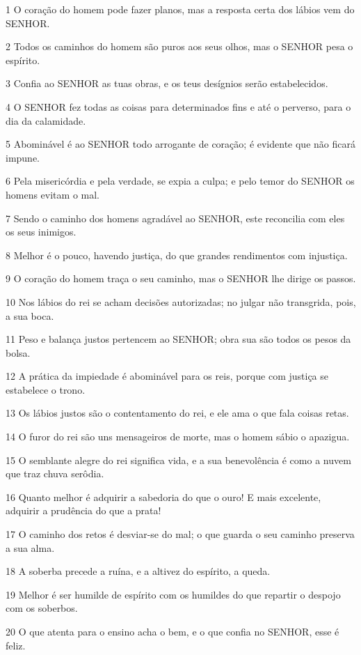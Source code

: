 \par 1 O coração do homem pode fazer planos, mas a resposta certa dos lábios vem do SENHOR.
\par 2 Todos os caminhos do homem são puros aos seus olhos, mas o SENHOR pesa o espírito.
\par 3 Confia ao SENHOR as tuas obras, e os teus desígnios serão estabelecidos.
\par 4 O SENHOR fez todas as coisas para determinados fins e até o perverso, para o dia da calamidade.
\par 5 Abominável é ao SENHOR todo arrogante de coração; é evidente que não ficará impune.
\par 6 Pela misericórdia e pela verdade, se expia a culpa; e pelo temor do SENHOR os homens evitam o mal.
\par 7 Sendo o caminho dos homens agradável ao SENHOR, este reconcilia com eles os seus inimigos.
\par 8 Melhor é o pouco, havendo justiça, do que grandes rendimentos com injustiça.
\par 9 O coração do homem traça o seu caminho, mas o SENHOR lhe dirige os passos.
\par 10 Nos lábios do rei se acham decisões autorizadas; no julgar não transgrida, pois, a sua boca.
\par 11 Peso e balança justos pertencem ao SENHOR; obra sua são todos os pesos da bolsa.
\par 12 A prática da impiedade é abominável para os reis, porque com justiça se estabelece o trono.
\par 13 Os lábios justos são o contentamento do rei, e ele ama o que fala coisas retas.
\par 14 O furor do rei são uns mensageiros de morte, mas o homem sábio o apazigua.
\par 15 O semblante alegre do rei significa vida, e a sua benevolência é como a nuvem que traz chuva serôdia.
\par 16 Quanto melhor é adquirir a sabedoria do que o ouro! E mais excelente, adquirir a prudência do que a prata!
\par 17 O caminho dos retos é desviar-se do mal; o que guarda o seu caminho preserva a sua alma.
\par 18 A soberba precede a ruína, e a altivez do espírito, a queda.
\par 19 Melhor é ser humilde de espírito com os humildes do que repartir o despojo com os soberbos.
\par 20 O que atenta para o ensino acha o bem, e o que confia no SENHOR, esse é feliz.
